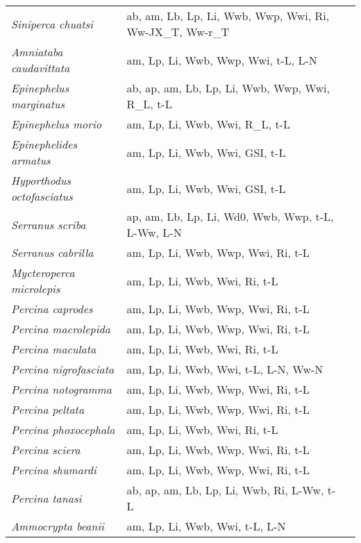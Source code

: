 {\begin{longtable}[c]{p{3.5cm}p{5.5cm}p{5.5cm}}
\emph{Siniperca chuatsi} &  ab, am, Lb, Lp, Li, Wwb, Wwp, Wwi, Ri, Ww-JX\_T, Ww-r\_T & \citet{LiuCui1998} \\
\emph{Amniataba caudavittata} &  am, Lp, Li, Wwb, Wwp, Wwi, t-L, L-N & \citet{WiseNeir1994,WisePott1994} \\
\emph{Epinephelus marginatus} &  ab, ap, am, Lb, Lp, Li, Wwb, Wwp, Wwi, R\_L, t-L & \citet{GlamSkar1998,RenoGrau2010,Goth1991,Cunha2009,Heemstra1993,SeybCond2011} \\
\emph{Epinephelus morio} &  am, Lp, Li, Wwb, Wwi, R\_L, t-L & \citet{Jone2000} \\
\emph{Epinephelides armatus} &  am, Lp, Li, Wwb, Wwi, GSI, t-L & \citet{MoorHeso2007} \\
\emph{Hyporthodus octofasciatus} &  am, Lp, Li, Wwb, Wwi, GSI, t-L & \citet{WakeWill2015,WakeNewm2013} \\
\emph{Serranus scriba} &  ap, am, Lb, Lp, Li, Wd0, Wwb, Wwp, t-L, L-Ww, L-N & \citet{AlonAlos2011,Alva2017,AlosAlon2013,AlosPalm2010} \\
\emph{Serranus cabrilla} &  am, Lp, Li, Wwb, Wwp, Wwi, Ri, t-L & \citet{TserTsim2001} \\
\emph{Mycteroperca microlepis} &  am, Lp, Li, Wwb, Wwi, Ri, t-L & \citet{StreFitz2003} \\
\emph{Percina caprodes} &  am, Lp, Li, Wwb, Wwp, Wwi, Ri, t-L &  \\
\emph{Percina macrolepida} &  am, Lp, Li, Wwb, Wwp, Wwi, Ri, t-L &  \\
\emph{Percina maculata} &  am, Lp, Li, Wwb, Wwi, Ri, t-L & \citet{Karr1963} \\
\emph{Percina nigrofasciata} &  am, Lp, Li, Wwb, Wwi, t-L, L-N, Ww-N & \citet{Math1973,Karr1963} \\
\emph{Percina notogramma} &  am, Lp, Li, Wwb, Wwp, Wwi, Ri, t-L & \citet{Link1970} \\
\emph{Percina peltata} &  am, Lp, Li, Wwb, Wwp, Wwi, Ri, t-L & \citet{Link1970} \\
\emph{Percina phoxocephala} &  am, Lp, Li, Wwb, Wwi, Ri, t-L & \citet{Karr1963} \\
\emph{Percina sciera} &  am, Lp, Li, Wwb, Wwp, Wwi, Ri, t-L & \citet{PageSmit1970} \\
\emph{Percina shumardi} &  am, Lp, Li, Wwb, Wwp, Wwi, Ri, t-L &  \\
\emph{Percina tanasi} &  ab, ap, am, Lb, Lp, Li, Wwb, Ri, L-Ww, t-L & \citet{Star1977} \\
\emph{Ammocrypta beanii} &  am, Lp, Li, Wwb, Wwi, t-L, L-N & \citet{HemsRook1984} \\

\end{longtable}}
